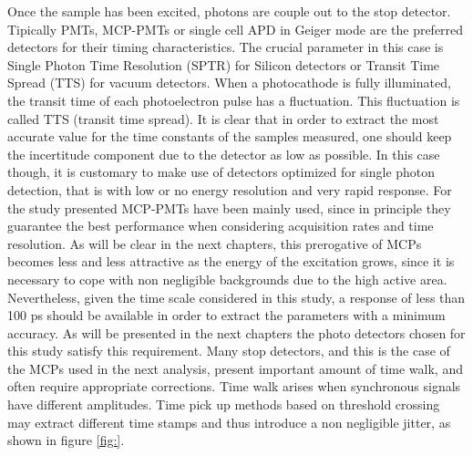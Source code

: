 Once the sample has been excited, photons are couple out to the stop detector. Tipically PMTs, MCP-PMTs or single cell APD in Geiger mode are the preferred detectors for their timing characteristics. The crucial parameter in this case is Single Photon Time Resolution (SPTR) for Silicon detectors or Transit Time Spread (TTS) for vacuum detectors.
When a photocathode is fully illuminated, the transit time of each photoelectron pulse has a fluctuation. This fluctuation is called TTS (transit time spread).
It is clear that in order to extract the most accurate value for the time constants of the samples measured, one should keep the incertitude component due to the detector as low as possible. In this case though, it is customary to make use of detectors optimized for single photon detection, that is with low or no energy resolution and very rapid response.
For the study presented MCP-PMTs have been mainly used, since in principle they guarantee the best performance when considering acquisition rates and time resolution.
As will be clear in the next chapters, this prerogative of MCPs becomes less and less attractive as the energy of the excitation grows, since it is necessary to cope with non negligible backgrounds due to the high active area.
Nevertheless, given the time scale considered in this study, a response of less than 100 ps should be available in order to extract the parameters with a minimum accuracy. As will be presented in the next chapters the photo detectors chosen for this study satisfy this requirement.
Many stop detectors, and this is the case of the MCPs used in the next analysis, present important amount of time walk, and often require appropriate corrections.
Time walk arises when synchronous signals have different amplitudes. Time pick up methods based on threshold crossing may extract different time stamps and thus introduce a non negligible jitter, as shown in figure \ref{fig:}.

